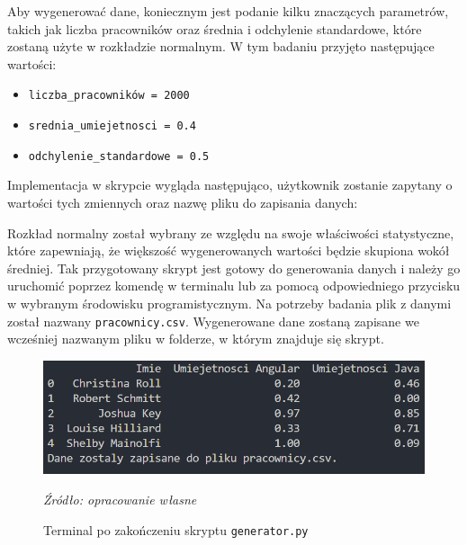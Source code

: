     
    
    \par Aby wygenerować dane, koniecznym jest podanie kilku znaczących parametrów, takich jak liczba pracowników oraz średnia i odchylenie standardowe, które zostaną użyte w rozkładzie normalnym. W tym badaniu przyjęto następujące wartości:
    
    \begin{itemize}
        \item \verb|liczba_pracowników = 2000|
        \item \verb|srednia_umiejetnosci = 0.4|
        \item \verb|odchylenie_standardowe = 0.5|
    \end{itemize}
    
    Implementacja w skrypcie wygląda następująco, użytkownik zostanie zapytany o wartości tych zmiennych oraz nazwę pliku do zapisania danych:
    
    
    
    \par Rozkład normalny został wybrany ze względu na swoje właściwości statystyczne, które zapewniają, że większość wygenerowanych wartości będzie skupiona wokół średniej. Tak przygotowany skrypt jest gotowy do generowania danych i należy go uruchomić poprzez komendę w terminalu lub za pomocą odpowiedniego przycisku w wybranym środowisku programistycznym. Na potrzeby badania plik z danymi został nazwany \verb|pracownicy.csv|. Wygenerowane dane zostaną zapisane we wcześniej nazwanym pliku w folderze, w którym znajduje się skrypt.
    
    

    \begin{figure}[H]
        \centering
        \includegraphics[width=\linewidth]{chapters/Images/terminal_generator.png}
        \cprotect\caption{Terminal po zakończeniu skryptu \verb|generator.py|}
        \textit{Źródło: opracowanie własne} 
    \end{figure}
    
